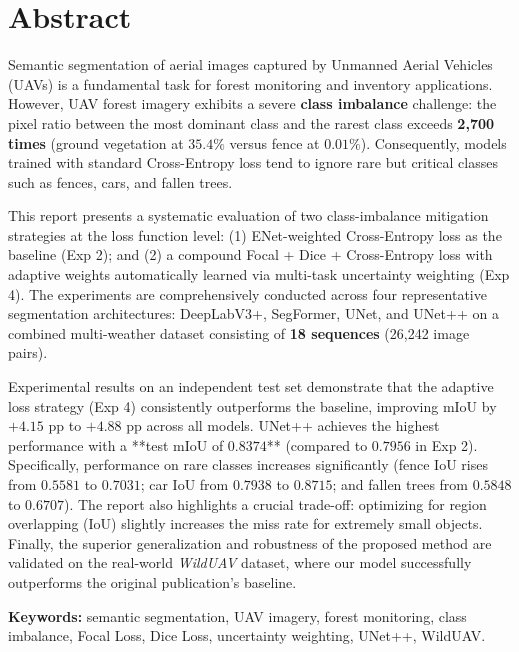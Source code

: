 \newpage
\chapter*{Abstract}

Semantic segmentation of aerial images captured by Unmanned Aerial Vehicles (UAVs) is a fundamental task for forest monitoring and inventory applications. However, UAV forest imagery exhibits a severe \textbf{class imbalance} challenge: the pixel ratio between the most dominant class and the rarest class exceeds \textbf{2,700 times} (ground vegetation at $35.4\%$ versus fence at $0.01\%$). Consequently, models trained with standard Cross-Entropy loss tend to ignore rare but critical classes such as fences, cars, and fallen trees.

This report presents a systematic evaluation of two class-imbalance mitigation strategies at the loss function level: (1) ENet-weighted Cross-Entropy loss as the baseline (Exp 2); and (2) a compound Focal + Dice + Cross-Entropy loss with adaptive weights automatically learned via multi-task uncertainty weighting (Exp 4). The experiments are comprehensively conducted across four representative segmentation architectures: DeepLabV3+, SegFormer, UNet, and UNet++ on a combined multi-weather dataset consisting of \textbf{18 sequences} (26,242 image pairs).

Experimental results on an independent test set demonstrate that the adaptive loss strategy (Exp 4) consistently outperforms the baseline, improving mIoU by $+4.15$ pp to $+4.88$ pp across all models. UNet++ achieves the highest performance with a **test mIoU of $0.8374$** (compared to $0.7956$ in Exp 2). Specifically, performance on rare classes increases significantly (fence IoU rises from $0.5581$ to $0.7031$; car IoU from $0.7938$ to $0.8715$; and fallen trees from $0.5848$ to $0.6707$). The report also highlights a crucial trade-off: optimizing for region overlapping (IoU) slightly increases the miss rate for extremely small objects. Finally, the superior generalization and robustness of the proposed method are validated on the real-world \textit{WildUAV} dataset, where our model successfully outperforms the original publication's baseline.

\vspace{0.3cm}
\noindent\textbf{Keywords:} semantic segmentation, UAV imagery, forest monitoring, class imbalance, Focal Loss, Dice Loss, uncertainty weighting, UNet++, WildUAV.
